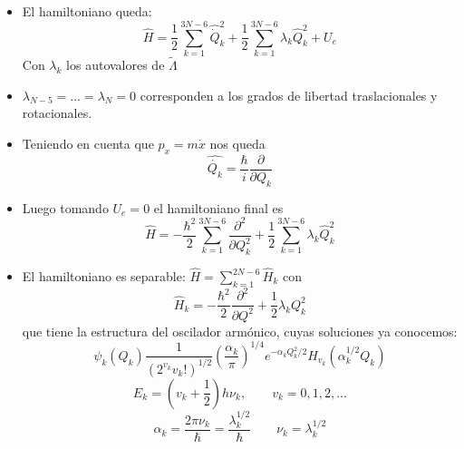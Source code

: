 \documentclass[a4paper]{beamer}
\begin{document}
\begin{frame}
\begin{itemize}
\item El hamiltoniano queda:
\begin{equation}
\hat H= \frac{1}{2}\sum_{k=1}^{3N-6} \hat{\dot Q}_k^2 + \frac{1}{2} \sum_{k=1}^{3N-6} \lambda_k \hat Q_k^2 + U_e
\end{equation}
{\tiny Con $\lambda_k$ los autovalores de $\tilde \Lambda$}
\item $\lambda_{N-5}=...=\lambda_N=0$ corresponden a los grados de libertad traslacionales y rotacionales.
\item Teniendo en cuenta que $p_x=m\dot x$ nos queda 
\begin{equation}
\hat{\dot{Q_k}}=\frac{\hbar}{i}\frac{\partial}{\partial Q_k}
\end{equation}
\item Luego tomando $U_e=0$ el hamiltoniano final es
\begin{equation}
\hat H= -\frac{\hbar^2}{2}\sum_{k=1}^{3N-6} \frac{\partial^2}{\partial Q^2_k} + \frac{1}{2} \sum_{k=1}^{3N-6} \lambda_k \hat Q_k^2
\end{equation}
\end{itemize}
\end{frame}

\begin{frame}
\begin{itemize}
\item El hamiltoniano es separable: $\hat H=\displaystyle\sum_{k=1}^{2N-6} \hat H_k$ con
\begin{equation}
\hat H_k = -\frac{\hbar^2}{2}\frac{\partial^2}{\partial Q^2}+\frac{1}{2}\lambda_kQ_k^2
\end{equation}
que tiene la estructura del oscilador armónico, cuyas soluciones ya conocemos:
\begin{equation}
\psi_k(Q_k)\frac{1}{\left(2^{v_k}v_k!\right)^{1/2}}\left(\frac{\alpha_k}{\pi}\right)^{1/4}e^{-\alpha_kQ^2_k/2}H_{v_k}(\alpha_k^{1/2}Q_k)
\end{equation}
\begin{equation}
E_k=\left(v_k+\frac{1}{2}\right)h\nu_k,	\qquad v_k=0,1,2,...
\end{equation}
\begin{equation}
\alpha_k=\frac{2\pi\nu_k}{\hbar}=\frac{\lambda_k^{1/2}}{\hbar} \qquad \nu_k=\lambda_k^{1/2}
\end{equation}
\end{itemize}
\end{frame}
\end{document}

